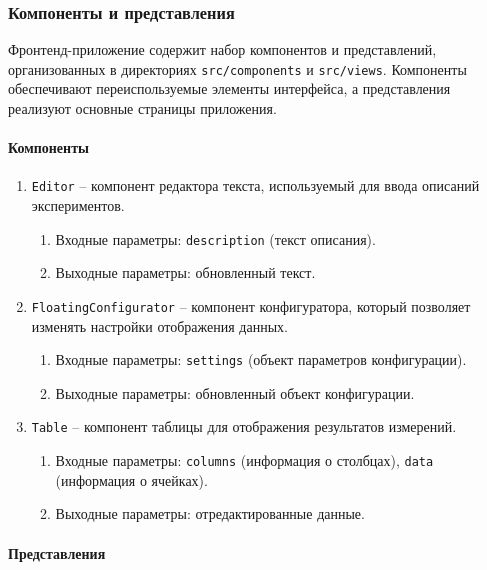 \subsubsection{Компоненты и представления}

Фронтенд-приложение содержит набор компонентов и представлений, организованных в директориях \texttt{src/components} и \texttt{src/views}. Компоненты обеспечивают переиспользуемые элементы интерфейса, а представления реализуют основные страницы приложения.

\paragraph{Компоненты}

\begin{enumerate}
    \item \texttt{Editor} -- компонент редактора текста, используемый для ввода описаний экспериментов.
    \begin{enumerate}[label=\arabic{enumi}.\arabic*.]
        \item Входные параметры: \texttt{description} (текст описания).
        \item Выходные параметры: обновленный текст.
    \end{enumerate}

    \item \texttt{FloatingConfigurator} -- компонент конфигуратора, который позволяет изменять настройки отображения данных.
    \begin{enumerate}[label=\arabic{enumi}.\arabic*.]
        \item Входные параметры: \texttt{settings} (объект параметров конфигурации).
        \item Выходные параметры: обновленный объект конфигурации.
    \end{enumerate}

    \item \texttt{Table} -- компонент таблицы для отображения результатов измерений.
    \begin{enumerate}[label=\arabic{enumi}.\arabic*.]
        \item Входные параметры: \texttt{columns} (информация о столбцах), \texttt{data} (информация о ячейках).
        \item Выходные параметры: отредактированные данные.
    \end{enumerate}
\end{enumerate}

\paragraph{Представления}

